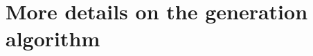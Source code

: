 \documentclass{lncs/llncs}
\newcommand{\TODO}[1]{\textcolor{red}{\textbf{[TODO:#1]}}}
\newcommand{\OTvar}{\texttt}
\begin{document}
\appendix

\section{More details on the generation algorithm}




%
%
%
\end{document}
